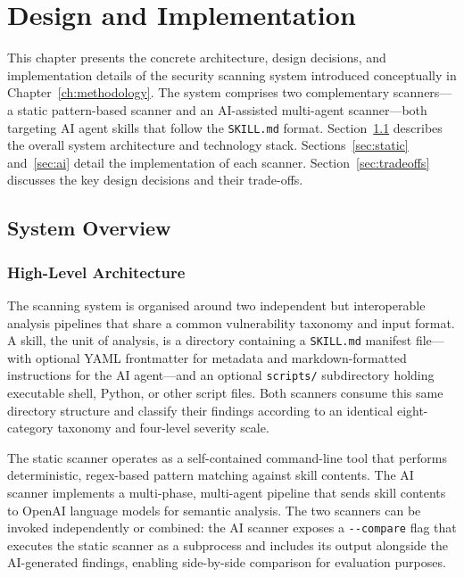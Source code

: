 \chapter{Design and Implementation}
\label{ch:design}

This chapter presents the concrete architecture, design decisions, and implementation details of the security scanning system introduced conceptually in Chapter~\ref{ch:methodology}. The system comprises two complementary scanners---a static pattern-based scanner and an AI-assisted multi-agent scanner---both targeting AI agent skills that follow the \texttt{SKILL.md} format. Section~\ref{sec:overview} describes the overall system architecture and technology stack. Sections~\ref{sec:static} and~\ref{sec:ai} detail the implementation of each scanner. Section~\ref{sec:tradeoffs} discusses the key design decisions and their trade-offs.

\section{System Overview}
\label{sec:overview}

\subsection{High-Level Architecture}

The scanning system is organised around two independent but interoperable analysis pipelines that share a common vulnerability taxonomy and input format. A skill, the unit of analysis, is a directory containing a \texttt{SKILL.md} manifest file---with optional YAML frontmatter for metadata and markdown-formatted instructions for the AI agent---and an optional \texttt{scripts/} subdirectory holding executable shell, Python, or other script files. Both scanners consume this same directory structure and classify their findings according to an identical eight-category taxonomy and four-level severity scale.

The static scanner operates as a self-contained command-line tool that performs deterministic, regex-based pattern matching against skill contents. The AI scanner implements a multi-phase, multi-agent pipeline that sends skill contents to OpenAI language models for semantic analysis. The two scanners can be invoked independently or combined: the AI scanner exposes a \texttt{-{}-compare} flag that executes the static scanner as a subprocess and includes its output alongside the AI-generated findings, enabling side-by-side comparison for evaluation purposes.

